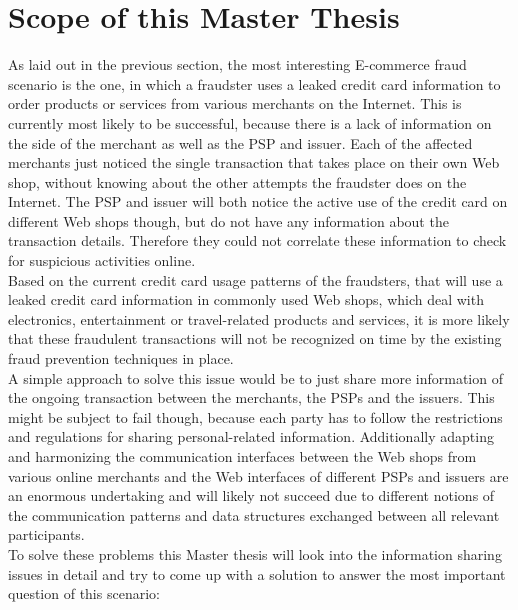 
\section{Scope of this Master Thesis}
\label{sec:scope_thesis}

As laid out in the previous section, the most interesting \gls{E-commerce} fraud scenario is the one, in which a fraudster uses a leaked credit card information to order products or services from various merchants on the Internet. This is currently most likely to be successful, because there is a lack of information on the side of the merchant as well as the \gls{PSP} and issuer. Each of the affected merchants just noticed the single transaction that takes place on their own Web shop, without knowing about the other attempts the fraudster does on the Internet. The \gls{PSP} and issuer will both notice the active use of the credit card on different Web shops though, but do not have any information about the transaction details. Therefore they could not correlate these information to check for suspicious activities online. \\

Based on the current credit card usage patterns of the fraudsters, that will use a leaked credit card information in commonly used Web shops, which deal with electronics, entertainment or travel-related products and services, it is more likely that these fraudulent transactions will not be recognized on time by the existing fraud prevention techniques in place. \\

A simple approach to solve this issue would be to just share more information of the ongoing transaction between the merchants, the \gls{PSP}s and the issuers. This might be subject to fail though, because each party has to follow the restrictions and regulations for sharing personal-related information. Additionally adapting and harmonizing the communication interfaces between the Web shops from various online merchants and the Web interfaces of different \gls{PSP}s and issuers are an enormous undertaking and will likely not succeed due to different notions of the communication patterns and data structures exchanged between all relevant participants. \\

To solve these problems this Master thesis will look into the information sharing issues in detail and try to come up with a solution to answer the most important question of this scenario: \@

